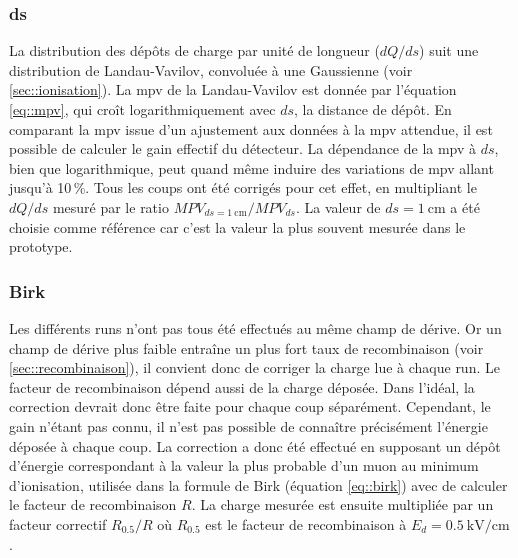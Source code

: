       \subsubsection{ds}
        La distribution des dépôts de charge par unité de longueur ($dQ/ds$) suit une distribution de Landau-Vavilov, convoluée à une Gaussienne (voir \autoref{sec::ionisation}). La \gls{mpv} de la Landau-Vavilov est donnée par l'équation \eqref{eq::mpv}, qui croît logarithmiquement avec $ds$, la distance de dépôt. En comparant la \gls{mpv} issue d'un ajustement aux données à la \gls{mpv} attendue, il est possible de calculer le gain effectif du détecteur. La dépendance de la \gls{mpv} à $ds$, bien que logarithmique, peut quand même induire des variations de \gls{mpv} allant jusqu'à 10\,\%. Tous les coups ont été corrigés pour cet effet, en multipliant le $dQ/ds$ mesuré par le ratio $MPV_{ds=\SI{1}{\centi\meter}}/MPV_{ds}$. La valeur de $ds=\SI{1}{\centi\meter}$ a été choisie comme référence car c'est la valeur la plus souvent mesurée dans le prototype.
      \subsubsection{Birk}
        Les différents runs n'ont pas tous été effectués au même champ de dérive. Or un champ de dérive plus faible entraîne un plus fort taux de recombinaison (voir \autoref{sec::recombinaison}), il convient donc de corriger la charge lue à chaque run. Le facteur de recombinaison dépend aussi de la charge déposée. Dans l'idéal, la correction devrait donc être faite pour chaque coup séparément. Cependant, le gain n'étant pas connu, il n'est pas possible de connaître précisément l'énergie déposée à chaque coup. La correction a donc été effectué en supposant un dépôt d'énergie correspondant à la valeur la plus probable d'un muon au minimum d'ionisation, utilisée dans la formule de Birk (équation \eqref{eq::birk}) avec de calculer le facteur de recombinaison $R$. 
        La charge mesurée est ensuite multipliée par un facteur correctif $R_{0.5}/R$ où $R_{0.5}$ est le facteur de recombinaison à $E_d=\SI{0.5}{\kilo\volt\per\centi\meter}$.
